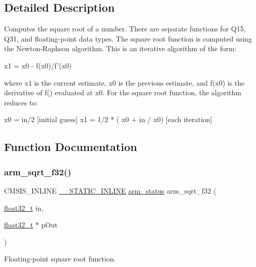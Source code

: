 \subsection{Detailed Description}
Computes the square root of a number. There are separate functions for Q15, Q31, and floating-\/point data types. The square root function is computed using the Newton-\/\+Raphson algorithm. This is an iterative algorithm of the form\+: 
\begin{DoxyPre}
     x1 = x0 - f(x0)/f'(x0)
\end{DoxyPre}
 where {\ttfamily x1} is the current estimate, {\ttfamily x0} is the previous estimate, and {\ttfamily f\textquotesingle{}(x0)} is the derivative of {\ttfamily f()} evaluated at {\ttfamily x0}. For the square root function, the algorithm reduces to\+: 
\begin{DoxyPre}
    x0 = in/2                         [initial guess]
    x1 = 1/2 * ( x0 + in / x0)        [each iteration]
\end{DoxyPre}
 

\subsection{Function Documentation}
\mbox{\label{group___s_q_r_t_ga697d82c2747a3302cf44e7c9583da2e8}} 
\subsubsection{\texorpdfstring{arm\+\_\+sqrt\+\_\+f32()}{arm\_sqrt\_f32()}}
{\footnotesize\ttfamily C\+M\+S\+I\+S\+\_\+\+I\+N\+L\+I\+NE \mbox{\hyperlink{cmsis__iccarm_8h_aba87361bfad2ae52cfe2f40c1a1dbf9c}{\+\_\+\+\_\+\+S\+T\+A\+T\+I\+C\+\_\+\+I\+N\+L\+I\+NE}} \mbox{\hyperlink{arm__math_8h_a5e459c6409dfcd2927bb8a57491d7cf6}{arm\+\_\+status}} arm\+\_\+sqrt\+\_\+f32 (\begin{DoxyParamCaption}\item[{\mbox{\hyperlink{arm__math_8h_a4611b605e45ab401f02cab15c5e38715}{float32\+\_\+t}}}]{in,  }\item[{\mbox{\hyperlink{arm__math_8h_a4611b605e45ab401f02cab15c5e38715}{float32\+\_\+t}} $\ast$}]{p\+Out }\end{DoxyParamCaption})}



Floating-\/point square root function. 



